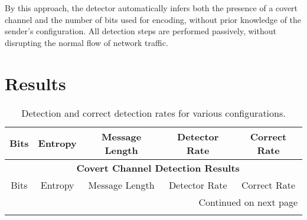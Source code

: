 \documentclass[10pt,a4paper]{article}
\begin{document}
By this approach, the detector automatically infers both the presence of a covert channel and the number of bits used for encoding, without prior knowledge of the sender's configuration.
All detection steps are performed passively, without disrupting the normal flow of network traffic.

\section*{Results}


\begin{center}
\begin{longtable}{ccccc}
\caption{Detection and correct detection rates for various configurations.} \\
\toprule
Bits & Entropy & Message Length & Detector Rate & Correct Rate \\
\midrule
\endfirsthead

\multicolumn{5}{c}{{\bfseries \tablename\ \thetable{} Covert Channel Detection Results}} \\
\toprule
Bits & Entropy & Message Length & Detector Rate & Correct Rate \\
\midrule
\endhead

\midrule \multicolumn{5}{r}{{Continued on next page}} \\
\endfoot

\bottomrule
\endlastfoot


\end{longtable}
\end{center}
\end{document}
